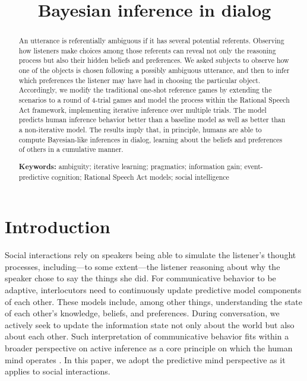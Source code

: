\documentclass[10pt,a4paper]{article}
\title{Bayesian inference in dialog}
\begin{document}
\maketitle

\begin{abstract}
	
An utterance is referentially ambiguous if it has several potential referents.
Observing how listeners make choices among those referents can reveal not only the reasoning process but also their hidden beliefs and preferences.
We asked subjects to observe how one of the objects is chosen following a possibly ambiguous utterance, and then to infer which preferences the listener may have had in choosing the particular object.
Accordingly, we modify the traditional one-shot reference games by extending the scenarios to a round of 4-trial games and model the process within the Rational Speech Act framework, implementing iterative inference over multiple trials.
The model predicts human inference behavior better than a baseline model as well as better than a non-iterative model. 
The results imply that, in principle, humans are able to compute Bayesian-like inferences in dialog, learning about the beliefs and preferences of others in a cumulative manner.
                                                     

\textbf{Keywords:} 
ambiguity; iterative learning; pragmatics; information gain; event-predictive cognition; Rational Speech Act models; social intelligence
\end{abstract}





\section{Introduction}

Social interactions rely on speakers being able to simulate the listener's thought processes, including---to some extent---the listener reasoning about why the speaker chose to say the things she did.
For communicative behavior to be adaptive, interlocutors need to continuously update predictive model components of each other.
These models include, among other things, understanding the state of each other's knowledge, beliefs, and preferences.
During conversation, we actively seek to update the information state not only about the world but also about each other.
Such interpretation of communicative behavior fits within a broader perspective on active inference as a core principle on which the human mind operates \cite{Friston:2015b}.
In this paper, we adopt the predictive mind perspective as it applies to social interactions.
\end{document}
